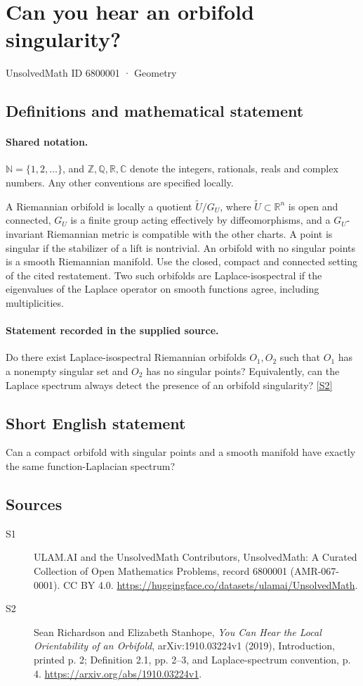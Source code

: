 \documentclass[11pt]{article}
\newcommand{\sref}[2]{\hyperlink{source:#1:#2}{[S#2]}}
\begin{document}
\setcounter{section}{6800000}
\section{Can you hear an orbifold singularity?}\label{6800001}
{\small\sffamily UnsolvedMath ID 6800001 · Geometry}
\subsection{Definitions and mathematical statement}

\paragraph{Shared notation.}$\mathbb N=\{1,2,\ldots\}$, and $\mathbb Z,\mathbb Q,\mathbb R,\mathbb C$ denote the integers, rationals, reals and complex numbers. Any other conventions are specified locally.


A Riemannian orbifold is locally a quotient $\widetilde U/G_U$, where $\widetilde U\subset\mathbb R^n$ is open and connected, $G_U$ is a finite group acting effectively by diffeomorphisms, and a $G_U$-invariant Riemannian metric is compatible with the other charts. A point is singular if the stabilizer of a lift is nontrivial. An orbifold with no singular points is a smooth Riemannian manifold. Use the closed, compact and connected setting of the cited restatement. Two such orbifolds are Laplace-isospectral if the eigenvalues of the Laplace operator on smooth functions agree, including multiplicities.
\paragraph{Statement recorded in the supplied source.}
Do there exist Laplace-isospectral Riemannian orbifolds $O_1,O_2$ such that $O_1$ has a nonempty singular set and $O_2$ has no singular points? Equivalently, can the Laplace spectrum always detect the presence of an orbifold singularity? \sref{6800001}{2}
\subsection{Short English statement}
Can a compact orbifold with singular points and a smooth manifold have exactly the same function-Laplacian spectrum?
\subsection{Sources}
\begin{description}
\item[\hypertarget{source:6800001:1}{S1}] ULAM.AI and the UnsolvedMath Contributors, UnsolvedMath: A Curated Collection of Open Mathematics Problems, record 6800001 (AMR-067-0001). CC BY 4.0. \url{https://huggingface.co/datasets/ulamai/UnsolvedMath}.
\item[\hypertarget{source:6800001:2}{S2}] Sean Richardson and Elizabeth Stanhope, \emph{You Can Hear the Local Orientability of an Orbifold}, arXiv:1910.03224v1 (2019), Introduction, printed p. 2; Definition 2.1, pp. 2--3, and Laplace-spectrum convention, p. 4. \url{https://arxiv.org/abs/1910.03224v1}.
\end{description}
\label{end:6800001}
\end{document}
